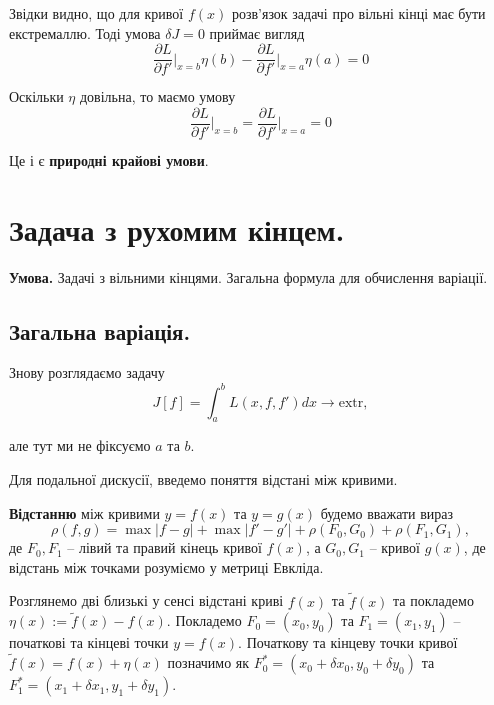 \documentclass[14pt]{extarticle}
\newcommand{\<}{\langle}
\renewcommand{\>}{\rangle}
\theoremstyle{mystyle}{\newtheorem{definition}{Definition}[section]}
\theoremstyle{mystyle}{\newtheorem{proposition}[definition]{Proposition}}
\theoremstyle{mystyle}{\newtheorem{theorem}[definition]{Theorem}}
\theoremstyle{mystyle}{\newtheorem{lemma}[definition]{Lemma}}
\theoremstyle{mystyle}{\newtheorem{corollary}[definition]{Corollary}}
\theoremstyle{mystyle}{\newtheorem*{remark}{Remark}}
\theoremstyle{mystyle}{\newtheorem*{remarks}{Remarks}}
\theoremstyle{mystyle}{\newtheorem*{example}{Example}}
\theoremstyle{mystyle}{\newtheorem*{examples}{Examples}}
\theoremstyle{definition}{\newtheorem*{exercise}{Exercise}}
\theoremstyle{cstyle}{\newtheorem*{cthm}{}}
\theoremstyle{warn}
\begin{document}
Звідки видно, що для кривої $f(x)$ розв'язок задачі про вільні кінці має бути екстремаллю. Тоді умова $\delta J = 0$ приймає вигляд 
\begin{equation}
    \frac{\partial L}{\partial f'}\Big|_{x=b}\eta(b) - \frac{\partial L}{\partial f'}\Big|_{x=a}\eta(a) = 0
\end{equation}

Оскільки $\eta$ довільна, то маємо умову
\begin{equation}
    \frac{\partial L}{\partial f'}\Big|_{x=b} = \frac{\partial L}{\partial f'}\Big|_{x=a} = 0
\end{equation}

Це і є \textbf{природні крайові умови}.

\pagebreak
\section{Задача з рухомим кінцем.}

\textbf{Умова.} Задачі з вільними кінцями. Загальна формула для обчислення варіації.

\subsection{Загальна варіація.}

Знову розглядаємо задачу
\begin{equation}
    J[f] = \int_a^b L(x,f,f')dx \to \text{extr},
\end{equation}

але тут ми не фіксуємо $a$ та $b$.

Для подальної дискусії, введемо поняття відстані між кривими.

\begin{definition}
    \textbf{Відстанню} між кривими $y=f(x)$ та $y=g(x)$ будемо вважати вираз 
    \begin{equation}
        \rho(f,g) = \max |f-g| + \max |f'-g'|+ \rho(F_0,G_0) + \rho(F_1,G_1),
    \end{equation}
    де $F_0,F_1$ -- лівий та правий кінець кривої $f(x)$, а $G_0,G_1$ -- кривої $g(x)$, де відстань між 
    точками розуміємо у метриці Евкліда.
\end{definition}

Розглянемо дві близькі у сенсі відстані криві $f(x)$ та $\widetilde{f}(x)$ та покладемо $\eta(x) := \widetilde{f}(x) - f(x)$. Покладемо $F_0=(x_0,y_0)$ та $F_1=(x_1,y_1)$ -- початкові та кінцеві точки $y=f(x)$. 
Початкову та кінцеву точки кривої $\widetilde{f}(x)=f(x)+\eta(x)$ позначимо як $F_0^*=(x_0+\delta x_0,y_0+\delta y_0)$ та $F_1^*=(x_1+\delta x_1,y_1+\delta y_1)$. 
\end{document}

